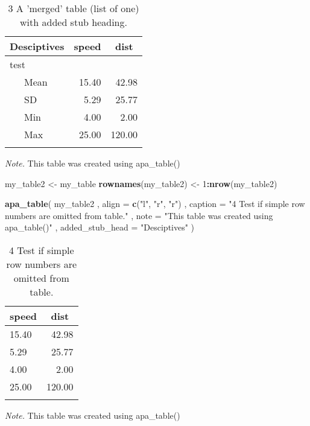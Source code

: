 \documentclass[man]{apa6}
\newenvironment{Shaded}{\begin{snugshade}}{\end{snugshade}}
\newcommand{\KeywordTok}[1]{\textcolor[rgb]{0.13,0.29,0.53}{\textbf{#1}}}
\newcommand{\DataTypeTok}[1]{\textcolor[rgb]{0.13,0.29,0.53}{#1}}
\newcommand{\DecValTok}[1]{\textcolor[rgb]{0.00,0.00,0.81}{#1}}
\newcommand{\StringTok}[1]{\textcolor[rgb]{0.31,0.60,0.02}{#1}}
\newcommand{\OperatorTok}[1]{\textcolor[rgb]{0.81,0.36,0.00}{\textbf{#1}}}
\newcommand{\NormalTok}[1]{#1}
\begin{document}
\begin{table}[tbp]
\begin{center}
\begin{threeparttable}
\caption{\label{tab:unnamed-chunk-5}3 A 'merged' table (list of one) with added stub heading.}
\begin{tabular}{lrr}
\toprule
Desciptives & \multicolumn{1}{c}{speed} & \multicolumn{1}{c}{dist}\\
\midrule
test &  & \\
\ \ \ Mean & 15.40 & 42.98\\
\ \ \ SD & 5.29 & 25.77\\
\ \ \ Min & 4.00 & 2.00\\
\ \ \ Max & 25.00 & 120.00\\
\bottomrule
\addlinespace
\end{tabular}
\begin{tablenotes}[para]
\normalsize{\textit{Note.} This table was created using apa\_table()}
\end{tablenotes}
\end{threeparttable}
\end{center}
\end{table}

\begin{Shaded}
\begin{Highlighting}[]
\NormalTok{my_table2 <-}\StringTok{ }\NormalTok{my_table}
\KeywordTok{rownames}\NormalTok{(my_table2) <-}\StringTok{ }\DecValTok{1}\OperatorTok{:}\KeywordTok{nrow}\NormalTok{(my_table2)}

\KeywordTok{apa_table}\NormalTok{(}
\NormalTok{  my_table2}
\NormalTok{  , }\DataTypeTok{align =} \KeywordTok{c}\NormalTok{(}\StringTok{"l"}\NormalTok{, }\StringTok{"r"}\NormalTok{, }\StringTok{"r"}\NormalTok{)}
\NormalTok{  , }\DataTypeTok{caption =} \StringTok{"4 Test if simple row numbers are omitted from table."}
\NormalTok{  , }\DataTypeTok{note =} \StringTok{"This table was created using apa_table()"}
\NormalTok{  , }\DataTypeTok{added_stub_head =} \StringTok{"Desciptives"}
\NormalTok{)}
\end{Highlighting}
\end{Shaded}

\begin{table}[tbp]
\begin{center}
\begin{threeparttable}
\caption{\label{tab:unnamed-chunk-5}4 Test if simple row numbers are omitted from table.}
\begin{tabular}{lr}
\toprule
speed & \multicolumn{1}{c}{dist}\\
\midrule
15.40 & 42.98\\
5.29 & 25.77\\
4.00 & 2.00\\
25.00 & 120.00\\
\bottomrule
\addlinespace
\end{tabular}
\begin{tablenotes}[para]
\normalsize{\textit{Note.} This table was created using apa\_table()}
\end{tablenotes}
\end{threeparttable}
\end{center}
\end{table}
\end{document}
